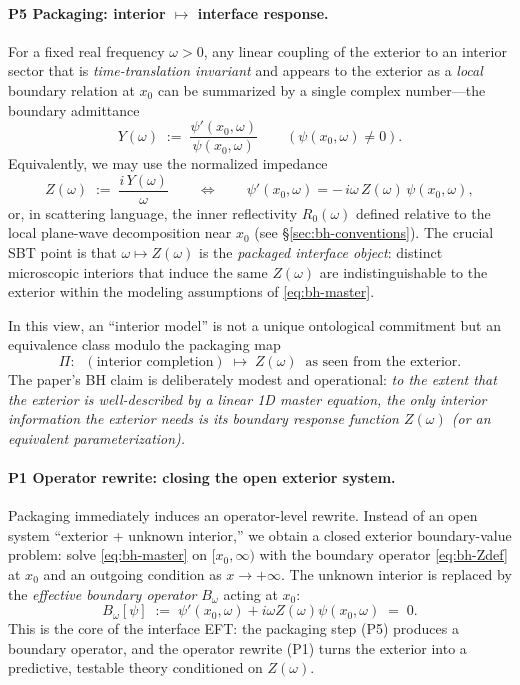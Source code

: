 \paragraph{P5 Packaging: interior $\mapsto$ interface response.}
For a fixed real frequency $\omega>0$, any linear coupling of the exterior to an interior sector that is \emph{time-translation invariant} and appears to the exterior as a \emph{local} boundary relation at $x_0$ can be summarized by a single complex number---the boundary admittance
\begin{equation}
  Y(\omega) \;:=\; \frac{\psi'(x_0,\omega)}{\psi(x_0,\omega)} \qquad (\psi(x_0,\omega)\neq 0).
  \label{eq:bh-Ydef}
\end{equation}
Equivalently, we may use the normalized impedance
\begin{equation}
  Z(\omega) \;:=\; \frac{i\,Y(\omega)}{\omega}
  \qquad\Longleftrightarrow\qquad
  \psi'(x_0,\omega) = -\,i\omega\,Z(\omega)\,\psi(x_0,\omega),
  \label{eq:bh-Zdef}
\end{equation}
or, in scattering language, the inner reflectivity $R_0(\omega)$ defined relative to the local plane-wave decomposition near $x_0$ (see \S\ref{sec:bh-conventions}). The crucial SBT point is that $\omega\mapsto Z(\omega)$ is the \emph{packaged interface object}: distinct microscopic interiors that induce the same $Z(\omega)$ are indistinguishable to the exterior within the modeling assumptions of \eqref{eq:bh-master}.

In this view, an ``interior model'' is not a unique ontological commitment but an equivalence class modulo the packaging map
\[
  \Pi:\;\; (\text{interior completion}) \;\mapsto\; Z(\omega)\;\;\text{as seen from the exterior}.
\]
The paper’s BH claim is deliberately modest and operational: \emph{to the extent that the exterior is well-described by a linear 1D master equation, the only interior information the exterior needs is its boundary response function $Z(\omega)$ (or an equivalent parameterization).}

\paragraph{P1 Operator rewrite: closing the open exterior system.}
Packaging immediately induces an operator-level rewrite. Instead of an open system ``exterior + unknown interior,'' we obtain a closed exterior boundary-value problem: solve \eqref{eq:bh-master} on $[x_0,\infty)$ with the boundary operator \eqref{eq:bh-Zdef} at $x_0$ and an outgoing condition as $x\to+\infty$. The unknown interior is replaced by the \emph{effective boundary operator} $B_\omega$ acting at $x_0$:
\[
  B_\omega[\psi] \;:=\; \psi'(x_0,\omega) + i\omega Z(\omega)\psi(x_0,\omega) \;=\; 0.
\]
This is the core of the interface EFT: the packaging step (P5) produces a boundary operator, and the operator rewrite (P1) turns the exterior into a predictive, testable theory conditioned on $Z(\omega)$.

